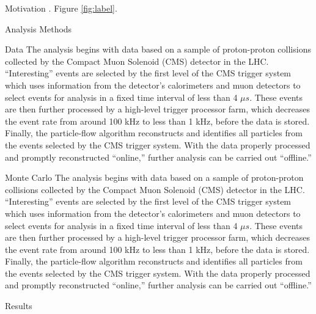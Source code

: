 \documentclass[oneside,12pt,final]{sty/ucthesis-CA2012}
\begin{document}
\begin{mainmatter}
\begin{section}{Motivation}
\cite{Maldacena:1997re,joesbook}. Figure \ref{fig:label}.

\end{section}

\begin{section}{Analysis Methods}
\begin{subsection}{Data}
The analysis begins with data based on a sample of proton-proton collisions collected by the Compact Muon Solenoid (CMS) detector in the LHC. ``Interesting'' events are selected by the first level of the CMS trigger system which uses information from the detector's calorimeters and muon detectors to select events for analysis in a fixed time interval of less than 4 $\mu s$. These events are then further processed by a high-level trigger processor farm, which decreases the event rate from around 100 kHz to less than 1 kHz, before the data is stored. Finally, the particle-flow algorithm reconstructs and identifies all particles from the events selected by the CMS trigger system. With the data properly processed and promptly reconstructed ``online,'' further analysis can be carried out ``offline.''
\end{subsection}
\begin{subsection}{Monte Carlo}
The analysis begins with data based on a sample of proton-proton collisions collected by the Compact Muon Solenoid (CMS) detector in the LHC. ``Interesting'' events are selected by the first level of the CMS trigger system which uses information from the detector's calorimeters and muon detectors to select events for analysis in a fixed time interval of less than 4 $\mu s$. These events are then further processed by a high-level trigger processor farm, which decreases the event rate from around 100 kHz to less than 1 kHz, before the data is stored. Finally, the particle-flow algorithm reconstructs and identifies all particles from the events selected by the CMS trigger system. With the data properly processed and promptly reconstructed ``online,'' further analysis can be carried out ``offline.''
\end{subsection}
\end{section}

\begin{section}{Results}

\end{section}



\appendix

\dsp


\end{mainmatter}
\end{document}
